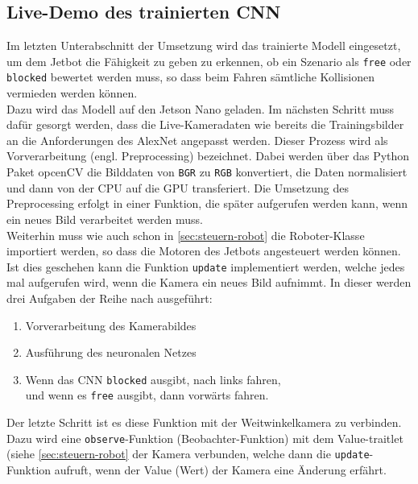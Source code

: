 \subsection{Live-Demo des trainierten CNN}

Im letzten Unterabschnitt der Umsetzung wird das trainierte Modell eingesetzt, um dem Jetbot die Fähigkeit zu geben zu erkennen, ob ein Szenario als \texttt{free} oder \texttt{blocked} bewertet werden muss, so dass beim Fahren sämtliche Kollisionen vermieden werden können. \\
Dazu wird das Modell auf den Jetson Nano geladen. Im nächsten Schritt muss dafür gesorgt werden, dass die Live-Kameradaten wie bereits die Trainingsbilder an die Anforderungen des AlexNet angepasst werden. Dieser Prozess wird als Vorverarbeitung (engl.\xspace Preprocessing) bezeichnet. Dabei werden über das Python Paket opcenCV die Bilddaten von \texttt{BGR} zu \texttt{RGB} konvertiert, die Daten normalisiert und dann von der CPU auf die GPU transferiert. Die Umsetzung des Preprocessing erfolgt in einer Funktion, die später aufgerufen werden kann, wenn ein neues Bild verarbeitet werden muss. \\
Weiterhin muss wie auch schon in \autoref{sec:steuern-robot} die Roboter-Klasse importiert werden, so dass die Motoren des Jetbots angesteuert werden können.\\
Ist dies geschehen kann die Funktion \glqq\texttt{update}\grqq{} implementiert werden, welche jedes mal aufgerufen wird, wenn die Kamera ein neues Bild aufnimmt. In dieser werden drei Aufgaben der Reihe nach ausgeführt:

\begin{enumerate}
    \item Vorverarbeitung des Kamerabildes
    \item Ausführung des neuronalen Netzes
    \item Wenn das CNN \texttt{blocked} ausgibt, nach links fahren,\\
    und wenn es \texttt{free} ausgibt, dann vorwärts fahren.
\end{enumerate}

Der letzte Schritt ist es diese Funktion mit der Weitwinkelkamera zu verbinden. Dazu wird eine \texttt{observe}-Funktion (Beobachter-Funktion) mit dem Value-traitlet (siehe \autoref{sec:steuern-robot} der Kamera verbunden, welche dann die \texttt{update}-Funktion aufruft, wenn der Value (Wert) der Kamera eine Änderung erfährt.

